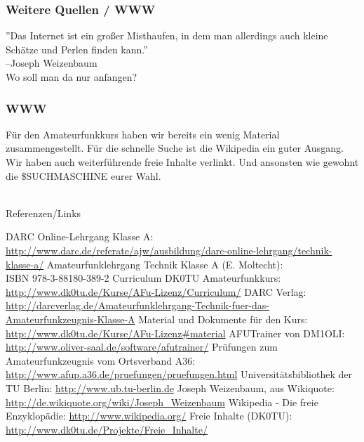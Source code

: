\begin{frame}
    \frametitle{Weitere Quellen / WWW}

    ''Das Internet ist ein großer Misthaufen, in dem man allerdings auch kleine
    Schätze und Perlen finden kann.''\hyperlink{refs}{\cite{quote}} \\[1em]
    \flushright --Joseph Weizenbaum \\[4em]

    \center Wo soll man da nur anfangen?

\end{frame}

\begin{frame}
    \frametitle{WWW}

    Für den Amateurfunkkurs haben wir bereits ein wenig
    Material\hyperlink{refs}{\cite{mat}} zusammengestellt. Für die schnelle
    Suche ist die Wikipedia\hyperlink{refs}{\cite{wp}} ein guter Ausgang. \\[2em]

    Wir haben auch weiterführende freie Inhalte\hyperlink{refs}{\cite{fi}}
    verlinkt. Und ansonsten wie gewohnt die \$SUCHMASCHINE eurer Wahl.

\end{frame}

\renewcommand{\refname}{Referenzen}

\hypertarget{refs}{}
\textcolor{white}{} \\ %
\Large Referenzen/Links
\footnotesize

\begin{thebibliography}{}
      DARC Online-Lehrgang Klasse A:
                    \url{http://www.darc.de/referate/ajw/ausbildung/darc-online-lehrgang/technik-klasse-a/}
     Amateurfunklehrgang Technik Klasse A (E. Moltecht): \\
                    ISBN 978-3-88180-389-2
      Curriculum DK0TU Amateurfunkkurs: \\
                    \url{http://www.dk0tu.de/Kurse/AFu-Lizenz/Curriculum/}
     DARC Verlag:
                    \url{http://darcverlag.de/Amateurfunklehrgang-Technik-fuer-das-Amateurfunkzeugnis-Klasse-A}
       Material und Dokumente für den Kurs:
                    \url{http://www.dk0tu.de/Kurse/AFu-Lizenz#material}
      AFUTrainer von DM1OLI:
                    \url{http://www.oliver-saal.de/software/afutrainer/}
      Prüfungen zum Amateurfunkzeugnis vom Ortsverband A36:
                    \url{http://www.afup.a36.de/pruefungen/pruefungen.html}
        Universitätsbibliothek der TU Berlin:
                    \url{http://www.ub.tu-berlin.de}
     Joseph Weizenbaum, aus Wikiquote:
                    \url{http://de.wikiquote.org/wiki/Joseph_Weizenbaum}
        Wikipedia - Die freie Enzyklopädie:
                    \url{http://www.wikipedia.org/}
        Freie Inhalte (DK0TU):
                    \url{http://www.dk0tu.de/Projekte/Freie_Inhalte/}
\end{thebibliography} 


